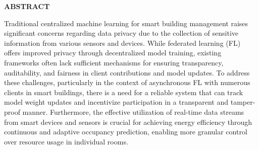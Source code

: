\documentclass[12pt,a4wide]{report}
\theoremstyle{plain}
\theoremstyle{definition}
\theoremstyle{remark}
\begin{document}
\clearpage






\begin{center}
{\Large{\bf{ABSTRACT}}}
\end{center}

Traditional centralized machine learning for smart building management raises significant concerns regarding data privacy due to the collection of sensitive information from various sensors and devices. While federated learning (FL) offers improved privacy through decentralized model training, existing frameworks often lack sufficient mechanisms for ensuring transparency, auditability, and fairness in client contributions and model updates. To address these challenges, particularly in the context of asynchronous FL with numerous clients in smart buildings, there is a need for a reliable system that can track model weight updates and incentivize participation in a transparent and tamper-proof manner. Furthermore, the effective utilization of real-time data streams from smart devices and sensors is crucial for achieving energy efficiency through continuous and adaptive occupancy prediction, enabling more granular control over resource usage in individual rooms.

\clearpage



\tableofcontents
\clearpage
\listoffigures
\listoftables


\newpage

\setcounter{page}{1}
















\setcounter{chapter}{7}





\end{document}
